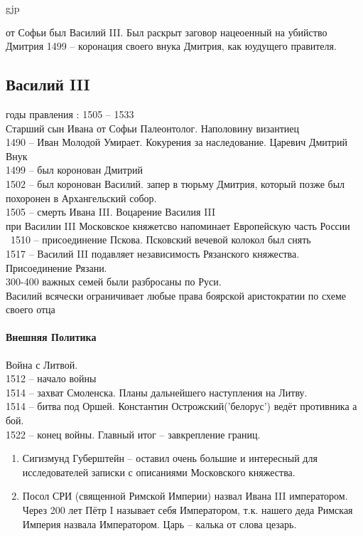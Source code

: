 gjp	 \documentclass[12pt,a4paper]{article}
\begin{document}
 от Софьи был Василий III. Был раскрыт заговор нацеоенный на убийство Дмитрия
 1499 -- коронация своего внука Дмитрия, как юудущего правителя.
 
 \subsection{Василий III}
 годы правления : 1505 -- 1533\\
 Старший сын Ивана от Софьи Палеонтолог. Наполовину византиец\\
 1490 -- Иван Молодой Умирает. Кокурения за наследование. Царевич Дмитрий Внук\\
1499 -- был коронован Дмитрий\\
1502 -- был коронован Василий. запер в тюрьму Дмитрия, который позже был похоронен в Архангельский собор.\\
1505 -- смерть Ивана III. Воцарение Василия III\\
при Василии III Московское княжетсво напоминает Европейскую часть России\\\
1510 -- присоединение Пскова. Псковский вечевой колокол был снять\\
1517 -- Василий III подавляет независимость Рязанского княжества. Присоединение Рязани.\\
300-400 важных семей были разбросаны по Руси.\\
Василий всячески ограничивает любые права боярской аристократии по схеме своего отца\\
\paragraph{Внешняя Политика}
Война с Литвой.\\
1512 -- начало войны \\
1514 -- захват Смоленска. Планы дальнейшего наступления на Литву.\\
1514 -- битва под Оршей. Константин Острожский('белорус') ведёт противника а бой. \\
1522 -- конец войны. Главный итог -- завкрепление границ.\\

\begin{enumerate}
	\item Сигизмунд Губерштейн -- оставил очень большие и интересный для исследователей записки с описаниями Московского княжества.
	\item Посол СРИ (священной Римской Империи) назвал Ивана III императором. Через 200 лет Пётр I называет себя Императором, т.к. нашего деда Римская Империя назвала Императором. Царь -- калька от слова цезарь.
\end{enumerate}
\end{document}
